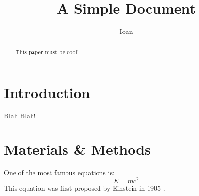 \documentclass[12pt]{article}
\title{A Simple Document}
\author{Ioan}
\date{}
\begin{document}
    \maketitle

    \begin{abstract}
        This paper must be cool!
    \end{abstract}

    \section{Introduction}
        Blah Blah!

    \section{Materials \& Methods}
        One of the most famous equations is:
    \begin{equation}
        E = mc^2
    \end{equation}
        This equation was first proposed by Einstein in 1905
    \cite{einstein1905does}.

    
    
\end{document}
